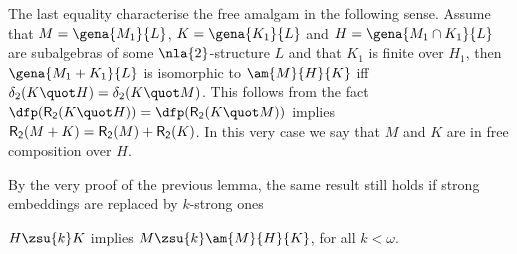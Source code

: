 The last equality characterise the free amalgam in the following
sense. Assume that $M=\gena{M_{1}}{L}$, $K=\gena{K_{1}}{L}$ and
$H=\gena{M_{1}\cap K_{1}}{L}$ are subalgebras of some $\nla{2}$-structure $L$ and that $K_{1}$ is finite over $H_{1}$, then $\gena{M_{1}+K_{1}}{L}$ is isomorphic to $\am{M}{H}{K}$ iff
$\delta_{2}(K\quot H)=\delta_{2}(K\quot M)$. This follows from the fact
$\dfp({\sf R_{2}}(K\quot H))=\dfp({\sf R_{2}}(K\quot M))$ implies ${\sf R_{2}}(M+K)=
{\sf R_{2}}(M)+{\sf R_{2}}(K)$.
In this very case
we say that $M$ and $K$ are in free composition over $H$.

\bigskip
By the very proof of the previous lemma, the same result still holds
if strong embeddings are replaced by $k$-strong ones
\begin{cor}
$H\zsu{k} K$ implies $M\zsu{k} \am{M}{H}{K}$, for all $k<\omega$.
\end{cor}

